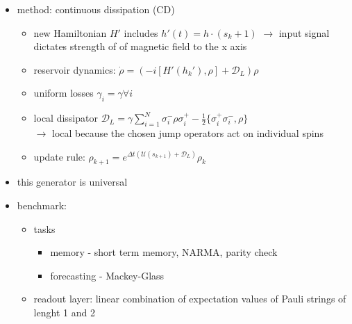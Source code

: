 \begin{itemize}
\begin{itemize}
        \item $L_i$: Jump operator, $\gamma_i$: dissipation rate
        \item here $L_i = \sigma_i^- = \frac{1}{2}(\sigma_i^x - i\sigma_i^y)$
    \end{itemize}
    \item method: continuous dissipation (CD)
    \begin{itemize}
        \item new Hamiltonian $H'$ includes $h'(t) = h\cdot(s_k+1)$ $\to$ input signal dictates strength of of magnetic field to the x axis
        \item reservoir dynamics: $\dot{\rho} = (-i[H'(h_k'), \rho]+\mathcal{D}_L)\rho$
        \item uniform losses $\gamma_i = \gamma \forall i$
        \item local dissipator $\mathcal{D}_L = \gamma \sum_{i=1}^{N} \sigma_i^- \rho \sigma_i^+ - \frac{1}{2}\{\sigma_i^+\sigma_i^-, \rho\}$ \\ 
        $\to$ local because the chosen jump operators act on individual spins
        \item update rule: $\rho_{k+1} = e^{\Delta t(\mathcal{U}(s_{k+1})+\mathcal{D}_L)}\rho_k$
    \end{itemize}
    \item this generator is universal
    \item benchmark:
    \begin{itemize}
        \item tasks
        \begin{itemize}
            \item memory - short term memory, NARMA, parity check
            \item forecasting - Mackey-Glass
        \end{itemize}
        \item readout layer: linear combination of expectation values of Pauli strings of lenght 1 and 2
    \end{itemize}
\end{itemize}

